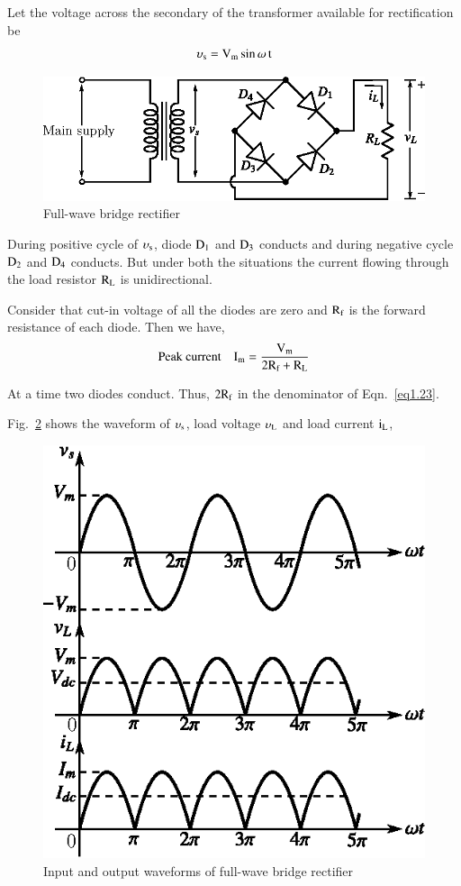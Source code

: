 Let the voltage across the secondary of the transformer available for rectification be
$$
\upsilon_{\textrm{s}}=\textrm{V}_{\textrm{m}}\sin \omega\, \textrm{t}
$$
\begin{figure}[H]
\centering
\includegraphics{chap1/fig1.35.eps}
\caption{Full-wave bridge rectifier}\label{fig1.35}
\end{figure}

During positive cycle of $\upsilon_{\textrm{s}}$, diode $\textrm{D}_{1}$ and $\textrm{D}_{3}$ conducts and during negative cycle $\textrm{D}_{2}$ and $\textrm{D}_{4}$ conducts. But under both the situations the current flowing through the load resistor $\textrm{R}_{\textrm{L}}$ is unidirectional.

Consider that cut-in voltage of all the diodes are zero and $\textrm{R}_{\textrm{f}}$ is the forward resistance of each diode. Then we have,
\begin{equation}
\text{Peak current}\quad \textrm{I}_{\textrm{m}}=\dfrac{\textrm{V}_{\textrm{m}}}{2\textrm{R}_{\textrm{f}}+\textrm{R}_{\textrm{L}}}\label{eq1.23}
\end{equation}

At a time two diodes conduct. Thus, $2\textrm{R}_{\textrm{f}}$ in the denominator of Eqn.~\eqref{eq1.23}.

Fig.~\ref{fig1.36} shows the waveform of $\upsilon_{\textrm{s}}$, load voltage $\upsilon_{\textrm{L}}$ and load current $\textrm{i}_{\textrm{L}}$,
\begin{figure}[H]
\centering
\includegraphics{chap1/fig1.36.eps}
\caption{Input and output waveforms of full-wave bridge rectifier}\label{fig1.36}
\end{figure}

